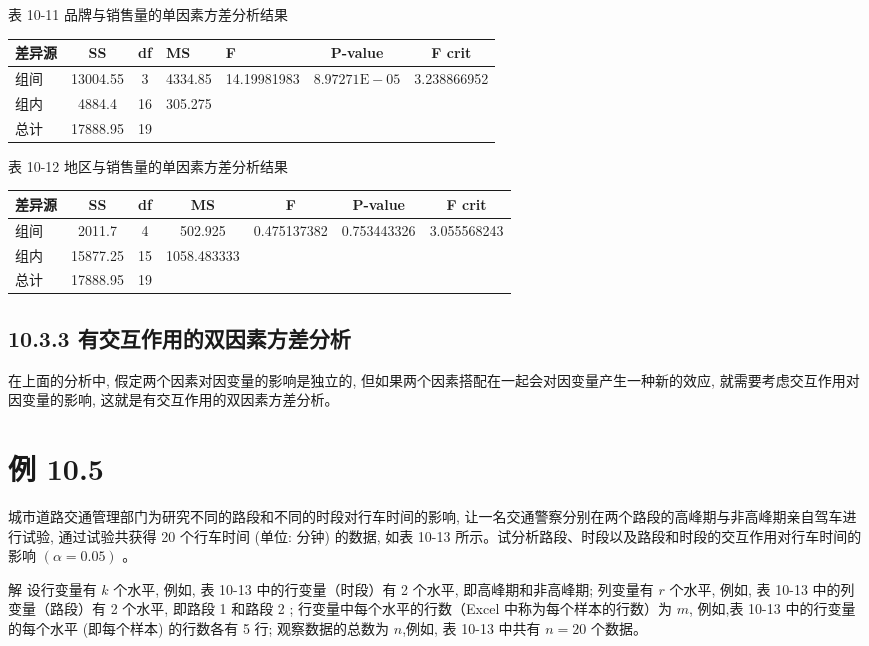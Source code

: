 \documentclass[10pt]{article}
\begin{document}
\begin{CJK*}{UTF8}{bsmi}
表 10-11 品牌与销售量的单因素方差分析结果

\begin{center}
\begin{tabular}{lccllcc}
\hline
差异源 & SS & df & \multicolumn{1}{l}{MS} & F & P-value & F crit \\
\hline
组间 & 13004.55 & 3 & 4334.85 & 14.19981983 & $8.97271 \mathrm{E}-05$ & 3.238866952 \\
组内 & 4884.4 & 16 & 305.275 &  &  &  \\
总计 & 17888.95 & 19 &  &  &  &  \\
\hline
\end{tabular}
\end{center}

表 10-12 地区与销售量的单因素方差分析结果

\begin{center}
\begin{tabular}{lcccccc}
\hline
差异源 & SS & df & MS & F & P-value & F crit \\
\hline
组间 & 2011.7 & 4 & 502.925 & 0.475137382 & 0.753443326 & 3.055568243 \\
组内 & 15877.25 & 15 & 1058.483333 &  &  &  \\
总计 & 17888.95 & 19 &  &  &  &  \\
\hline
\end{tabular}
\end{center}

\subsection*{10.3.3 有交互作用的双因素方差分析}
在上面的分析中, 假定两个因素对因变量的影响是独立的, 但如果两个因素搭配在一起会对因变量产生一种新的效应, 就需要考虑交互作用对因变量的影响, 这就是有交互作用的双因素方差分析。

\section*{例 10.5}
城市道路交通管理部门为研究不同的路段和不同的时段对行车时间的影响, 让一名交通警察分别在两个路段的高峰期与非高峰期亲自驾车进行试验, 通过试验共获得 20 个行车时间 (单位: 分钟) 的数据, 如表 10-13 所示。试分析路段、时段以及路段和时段的交互作用对行车时间的影响 $(\alpha=0.05)$ 。

解 设行变量有 $k$ 个水平, 例如, 表 10-13 中的行变量（时段）有 2 个水平, 即高峰期和非高峰期; 列变量有 $r$ 个水平, 例如, 表 10-13 中的列变量（路段）有 2 个水平, 即路段 1 和路段 2 ; 行变量中每个水平的行数（Excel 中称为每个样本的行数）为 $m$, 例如,表 10-13 中的行变量的每个水平 (即每个样本) 的行数各有 5 行; 观察数据的总数为 $n$,例如, 表 10-13 中共有 $n=20$ 个数据。


\end{CJK*}
\end{document}
